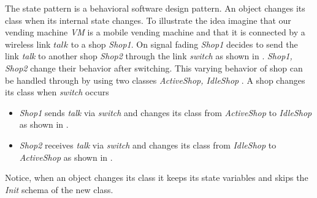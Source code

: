 The state pattern is a behavioral software design pattern. An object changes its class when its internal state changes. To illustrate the idea imagine that our vending machine \textit{VM} is a mobile vending machine and that it is connected by a wireless link $talk$ to a shop \textit{Shop1}. On signal fading \textit{Shop1} decides to send the link \textit{talk} to another shop \textit{Shop2} through the link \textit{switch} as shown in . \textit{Shop1, Shop2} change their behavior after switching. This varying behavior of shop can be handled through by using two classes \textit{ActiveShop, IdleShop} . A shop changes its class when \textit{switch} occurs
\begin{itemize}
\item \textit{Shop1} sends \textit{talk} via \textit{switch} and changes its class from \textit{ActiveShop} to \textit{IdleShop} as shown in .
\item \textit{Shop2} receives \textit{talk} via  \textit{switch} and changes its class from \textit{IdleShop} to \textit{ActiveShop} as shown in .
\end{itemize}
Notice, when an object changes its class it keeps its state variables and skips the \textit{Init} schema of the new class.



